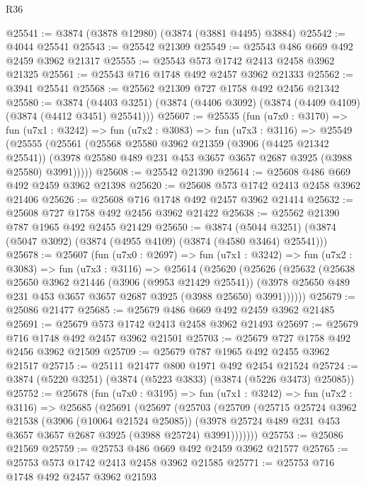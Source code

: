 \begin{lexlean}{R36}
\begin{coremodule}
@25541 := @3874 (@3878 @12980) (@3874 (@3881 @4495) @3884)
@25542 := @4044 @25541
@25543 := @25542 @21309
@25549 := @25543 @486 @669 @492 @2459 @3962 @21317
@25555 := @25543 @573 @1742 @2413 @2458 @3962 @21325
@25561 := @25543 @716 @1748 @492 @2457 @3962 @21333
@25562 := @3941 @25541
@25568 := @25562 @21309 @727 @1758 @492 @2456 @21342
@25580 := @3874
    (@4403 @3251)
    (@3874 (@4406 @3092) (@3874 (@4409 @4109) (@3874 (@4412 @3451) @25541)))
@25607 := @25535
    (fun (u7x0 : @3170) =>
    fun (u7x1 : @3242) =>
    fun (u7x2 : @3083) =>
    fun (u7x3 : @3116) =>
    @25549
      (@25555
        (@25561
          (@25568
            @25580
            @3962
            @21359
            (@3906 (@4425 @21342 @25541))
            (@3978 @25580 @489 @231 @453 @3657 @3657 @2687 @3925 (@3988 @25580) @3991)))))
@25608 := @25542 @21390
@25614 := @25608 @486 @669 @492 @2459 @3962 @21398
@25620 := @25608 @573 @1742 @2413 @2458 @3962 @21406
@25626 := @25608 @716 @1748 @492 @2457 @3962 @21414
@25632 := @25608 @727 @1758 @492 @2456 @3962 @21422
@25638 := @25562 @21390 @787 @1965 @492 @2455 @21429
@25650 := @3874
    (@5044 @3251)
    (@3874 (@5047 @3092) (@3874 (@4955 @4109) (@3874 (@4580 @3464) @25541)))
@25678 := @25607
    (fun (u7x0 : @2697) =>
    fun (u7x1 : @3242) =>
    fun (u7x2 : @3083) =>
    fun (u7x3 : @3116) =>
    @25614
      (@25620
        (@25626
          (@25632
            (@25638
              @25650
              @3962
              @21446
              (@3906 (@9953 @21429 @25541))
              (@3978 @25650 @489 @231 @453 @3657 @3657 @2687 @3925 (@3988 @25650) @3991))))))
@25679 := @25086 @21477
@25685 := @25679 @486 @669 @492 @2459 @3962 @21485
@25691 := @25679 @573 @1742 @2413 @2458 @3962 @21493
@25697 := @25679 @716 @1748 @492 @2457 @3962 @21501
@25703 := @25679 @727 @1758 @492 @2456 @3962 @21509
@25709 := @25679 @787 @1965 @492 @2455 @3962 @21517
@25715 := @25111 @21477 @800 @1971 @492 @2454 @21524
@25724 := @3874 (@5220 @3251) (@3874 (@5223 @3833) (@3874 (@5226 @3473) @25085))
@25752 := @25678
    (fun (u7x0 : @3195) =>
    fun (u7x1 : @3242) =>
    fun (u7x2 : @3116) =>
    @25685
      (@25691
        (@25697
          (@25703
            (@25709
              (@25715
                @25724
                @3962
                @21538
                (@3906 (@10064 @21524 @25085))
                (@3978 @25724 @489 @231 @453 @3657 @3657 @2687 @3925 (@3988 @25724) @3991)))))))
@25753 := @25086 @21569
@25759 := @25753 @486 @669 @492 @2459 @3962 @21577
@25765 := @25753 @573 @1742 @2413 @2458 @3962 @21585
@25771 := @25753 @716 @1748 @492 @2457 @3962 @21593

\end{coremodule}
\end{lexlean}
